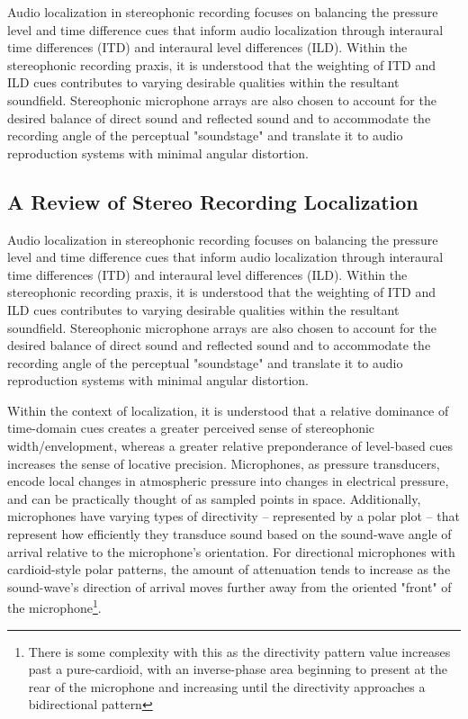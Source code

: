 Audio localization in stereophonic recording focuses on balancing the pressure level and time difference cues that inform audio localization through interaural time differences (ITD) and interaural level differences (ILD). Within the stereophonic recording praxis, it is understood that the weighting of ITD and ILD cues contributes to varying desirable qualities within the resultant soundfield. Stereophonic microphone arrays are also chosen to account for the desired balance of direct sound and reflected sound and to accommodate the recording angle of the perceptual "soundstage" and translate it to audio reproduction systems with minimal angular distortion.

\subsection{A Review of Stereo Recording Localization}

Audio localization in stereophonic recording focuses on balancing the pressure level and time difference cues that inform audio localization through interaural time differences (ITD) and interaural level differences (ILD). Within the stereophonic recording praxis, it is understood that the weighting of ITD and ILD cues contributes to varying desirable qualities within the resultant soundfield. Stereophonic microphone arrays are also chosen to account for the desired balance of direct sound and reflected sound and to accommodate the recording angle of the perceptual "soundstage" and translate it to audio reproduction systems with minimal angular distortion.

Within the context of localization, it is understood that a relative dominance of time-domain cues creates a greater perceived sense of stereophonic width/envelopment, whereas a greater relative preponderance of level-based cues increases the sense of locative precision. Microphones, as pressure transducers, encode local changes in atmospheric pressure into changes in electrical pressure, and can be practically thought of as sampled points in space. Additionally, microphones have varying types of directivity -- represented by a polar plot -- that represent how efficiently they transduce sound based on the sound-wave angle of arrival relative to the microphone's orientation. For directional microphones with cardioid-style polar patterns, the amount of attenuation tends to increase as the sound-wave's direction of arrival moves further away from the oriented "front" of the microphone\footnote{There is some complexity with this as the directivity pattern value increases past a pure-cardioid, with an inverse-phase area beginning to present at the rear of the microphone and increasing until the directivity approaches a bidirectional pattern}.

